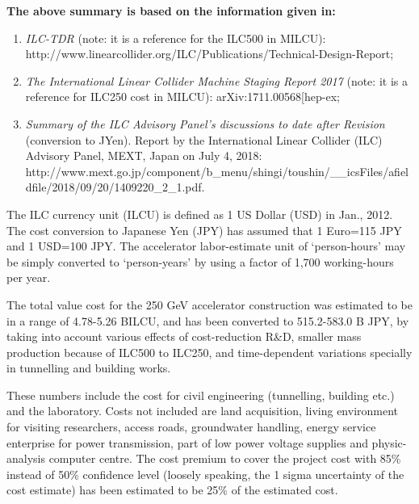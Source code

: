 \documentclass[%
 reprint,
 amsmath,amssymb,
 aps,
]{revtex4-1}
\begin{document}
\textbf{The above summary is based on the information given in:} 
\begin{enumerate}
\item 
\textit{ILC-TDR} (note: it is a reference for the ILC500 in MILCU): http://www.linearcollider.org/ILC/Publications/Technical-Design-Report;
\item
\textit{The International Linear Collider Machine Staging Report 2017} (note: it is a reference for ILC250 cost in MILCU): arXiv:1711.00568[hep-ex;
\item
\textit{Summary of the ILC Advisory Panel's discussions to date after Revision} (conversion to JYen). Report by the International Linear Collider (ILC) Advisory Panel, MEXT, Japan on July 4, 2018: http://www.mext.go.jp/component/b\_menu/shingi/toushin/\_\_icsFiles/afieldfile/2018/09/20/1409220\_2\_1.pdf.
\end{enumerate}
 
The ILC currency unit (ILCU) is defined as 1 US Dollar (USD) in Jan., 2012. The cost conversion to Japanese Yen (JPY) has assumed that 1 Euro=115 JPY and 1 USD=100 JPY. The accelerator labor-estimate unit of ‘person-hours’ may be simply converted to ‘person-years’ by using a factor of 1,700 working-hours per year.

The total value cost for the 250 GeV accelerator construction was estimated to be in a range of 4.78-5.26 BILCU, and has been converted to 515.2-583.0 B JPY, by taking into account various effects of cost-reduction R\&D, smaller mass production because of ILC500 to ILC250, and time-dependent variations specially in tunnelling and building works. 

These numbers include the cost for civil engineering (tunnelling, building etc.) and the laboratory. Costs not included are land acquisition, living environment for visiting researchers, access roads, groundwater handling, energy service enterprise for power transmission, part of low power voltage supplies and physic-analysis computer centre. The cost premium to cover the project cost with 85\% instead of 50\% confidence level (loosely speaking, the 1 sigma  uncertainty of the cost estimate) has been estimated to be 25\% of the estimated cost.


\end{document}
